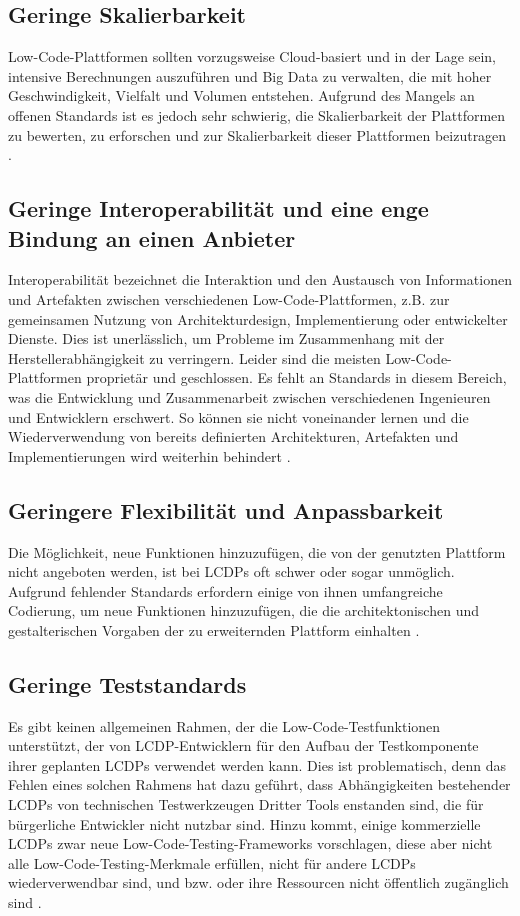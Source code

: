 \documentclass[12pt]{article} %
\begin{document}
	\subsection{Geringe Skalierbarkeit}	
	Low-Code-Plattformen sollten vorzugsweise Cloud-basiert und in der Lage sein, intensive Berechnungen auszuführen und Big Data zu verwalten, die mit hoher Geschwindigkeit, Vielfalt und Volumen entstehen. Aufgrund des Mangels an offenen Standards ist es jedoch sehr schwierig, die Skalierbarkeit der Plattformen zu bewerten, zu erforschen und zur Skalierbarkeit dieser Plattformen beizutragen \cite{Alamin.2023}.
	
	\subsection{Geringe Interoperabilität und eine enge Bindung an einen Anbieter}
	Interoperabilität bezeichnet die Interaktion und den Austausch von Informationen und Artefakten zwischen verschiedenen Low-Code-Plattformen, z.B. zur gemeinsamen Nutzung von Architekturdesign, Implementierung oder entwickelter Dienste. Dies ist unerlässlich, um Probleme im Zusammenhang mit der Herstellerabhängigkeit zu verringern. Leider sind die meisten Low-Code-Plattformen proprietär und geschlossen. Es fehlt an Standards in diesem Bereich, was die Entwicklung und Zusammenarbeit zwischen verschiedenen Ingenieuren und Entwicklern erschwert. So können sie nicht voneinander lernen und die Wiederverwendung von bereits definierten Architekturen, Artefakten und Implementierungen wird weiterhin behindert \cite{Alamin.2023}.  
	
	\subsection{Geringere Flexibilität und Anpassbarkeit}	
	Die Möglichkeit, neue Funktionen hinzuzufügen, die von der genutzten Plattform nicht angeboten werden, ist bei LCDPs oft schwer
	oder sogar unmöglich. Aufgrund fehlender Standards erfordern einige von ihnen umfangreiche Codierung, um neue Funktionen hinzuzufügen, die die architektonischen und gestalterischen Vorgaben der zu erweiternden Plattform einhalten \cite{Alamin.2023}.
	
	\subsection{Geringe Teststandards} 
	Es gibt keinen allgemeinen Rahmen, der die Low-Code-Testfunktionen unterstützt, der von LCDP-Entwicklern für den Aufbau der Testkomponente ihrer geplanten LCDPs verwendet werden kann. Dies ist problematisch, denn das Fehlen eines solchen Rahmens hat dazu geführt, dass Abhängigkeiten bestehender LCDPs von technischen Testwerkzeugen Dritter Tools enstanden sind, die für bürgerliche Entwickler nicht nutzbar sind. Hinzu kommt, einige kommerzielle LCDPs zwar neue Low-Code-Testing-Frameworks vorschlagen, diese aber nicht alle  Low-Code-Testing-Merkmale erfüllen, nicht für andere LCDPs wiederverwendbar sind, und bzw. oder ihre Ressourcen nicht öffentlich zugänglich sind \cite{Khorram.2020}.	
	
\end{document}
